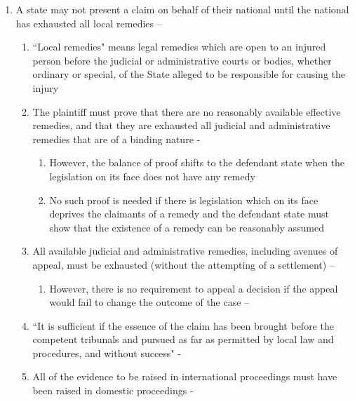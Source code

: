 \begin{enumerate}
\begin{enumerate}
\begin{enumerate}
        \end{enumerate}
        \item A state may not present a claim on behalf of their national until the national has exhausted all local remedies -- 
        \begin{enumerate}
            \item ``Local remedies" means legal remedies which are open to an injured person before the judicial or administrative courts or bodies, whether ordinary or special, of the State alleged to be responsible for causing the injury 
            \item The plaintiff must prove that there are no reasonably available effective remedies, and that they are exhausted all judicial and administrative remedies that are of a binding nature - 
            \begin{enumerate}
                \item However, the balance of proof shifts to the defendant state when the legislation on its face does not have any remedy
                \item No such proof is needed if there is legislation which on its face deprives the claimants of a remedy and the defendant state must show that the existence of a remedy can be reasonably assumed
            \end{enumerate}
            \item All available judicial and administrative remedies, including avenues of appeal, must be exhausted (without the attempting of a settlement) -- 
            \begin{enumerate}
                \item However, there is no requirement to appeal a decision if the appeal would fail to change the outcome of the case -- 
            \end{enumerate}
            \item ``It is sufficient if the essence of the claim has been brought before the competent tribunals and pursued as far as permitted by local law and procedures, and without success" - 
            \item All of the evidence to be raised in international proceedings must have been raised in domestic proceedings - 

\end{enumerate}
\end{enumerate}
\end{enumerate}
